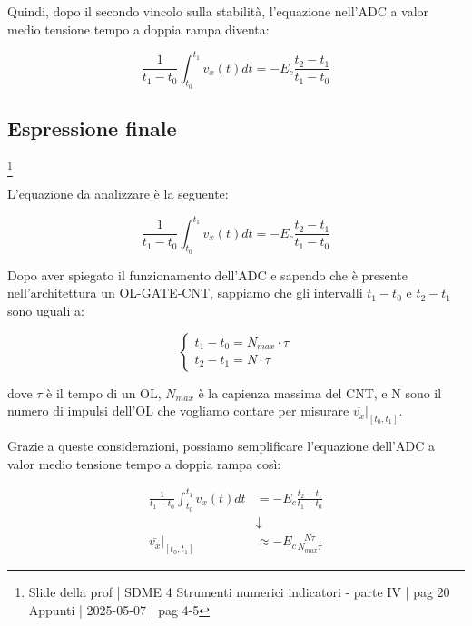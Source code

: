 Quindi, dopo il secondo vincolo sulla stabilità, 
l'equazione nell'ADC a valor medio tensione tempo a doppia rampa diventa:

{
    \Large
    \begin{equation}
       \frac{1}{t_1 - t_0}
        \int_{t_0}^{t_1} v_x(t) dt 
        =   
        -E_c 
        \frac{t_2 - t_1}{t_1 - t_0}
    \end{equation}
}

\newpage 

\subsection{Espressione finale}
\footnote{Slide della prof | SDME 4 Strumenti numerici indicatori - parte IV | pag 20\\  
Appunti | 2025-05-07 | pag 4-5}

L'equazione da analizzare è la seguente: 

{
    \Large
    \begin{equation}
       \frac{1}{t_1 - t_0}
        \int_{t_0}^{t_1} v_x(t) dt 
        =   
        -E_c 
        \frac{t_2 - t_1}{t_1 - t_0}
    \end{equation}
}

Dopo aver spiegato il funzionamento dell'ADC e sapendo che è presente nell'architettura un OL-GATE-CNT, 
sappiamo che gli intervalli $t_1 - t_0$ e $t_2 - t_1$ sono uguali a: 

{
    \Large 
    \begin{equation}
        \begin{cases}
            t_1 - t_0 = N_{max} \cdot \tau 
            \\
            t_2 - t_1 = N \cdot \tau
        \end{cases}
    \end{equation}
}

dove $\tau$ è il tempo di un OL, $N_{max}$ è la capienza massima del CNT, e N sono il numero di impulsi dell'OL che vogliamo contare per misurare $\left. \overline{v_x} \right|_{[t_0, t_1]}$. \newline 

Grazie a queste considerazioni, possiamo semplificare l'equazione dell'ADC a valor medio tensione tempo a doppia rampa così: 

{
    \Large 
    \begin{equation}
        \begin{split}
        \frac{1}{t_1 - t_0}
        \int_{t_0}^{t_1} v_x(t) dt 
        &=   
        -E_c 
        \frac{t_2 - t_1}{t_1 - t_0}
        \\
        &\downarrow
        \\  
        \left. \overline{v_x} \right|_{[t_0, t_1]}
        &\approx 
        -E_c 
        \frac{N \tau}{N_{max} \tau}
        \end{split}
    \end{equation}
}

